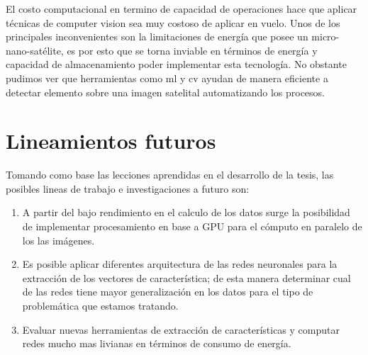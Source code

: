 El costo computacional en termino de capacidad de operaciones hace que aplicar técnicas de computer vision sea  muy costoso de aplicar en vuelo. Unos de los principales inconvenientes son la limitaciones de energía que posee un micro-nano-satélite, es por esto que se torna inviable en términos de energía y capacidad de almacenamiento poder implementar esta tecnología. No obstante pudimos ver que herramientas como \ac{ml} y \ac{cv} ayudan de manera eficiente a detectar elemento sobre una imagen satelital automatizando los procesos.



\section{Lineamientos futuros}\label{lineafuturas}
Tomando como base las lecciones aprendidas en el desarrollo de la tesis, las posibles lineas de trabajo e investigaciones a futuro son:
\begin{enumerate}
 \item A partir del bajo rendimiento en el calculo de los datos surge la posibilidad de implementar procesamiento en base a GPU para el cómputo en paralelo de los las imágenes.
 \item Es posible aplicar diferentes arquitectura de las redes neuronales para la extracción de los vectores de característica; de esta manera determinar cual de las redes tiene mayor generalización en los datos para el tipo de problemática que estamos tratando.
 \item Evaluar nuevas herramientas de extracción de características y computar redes mucho mas livianas en términos de consumo de energía.
\end{enumerate}
